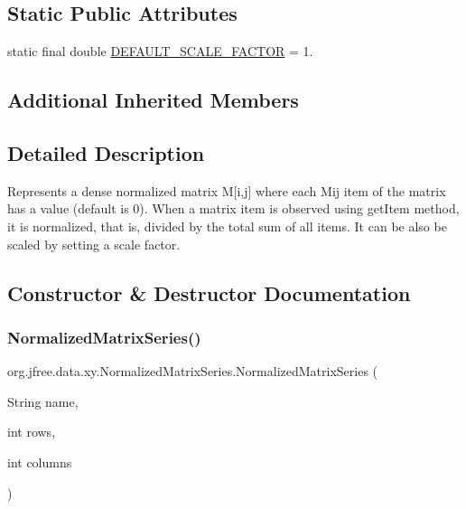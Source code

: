 \subsection*{Static Public Attributes}
\begin{DoxyCompactItemize}
\item 
static final double \mbox{\hyperlink{classorg_1_1jfree_1_1data_1_1xy_1_1_normalized_matrix_series_ad4891de503293749cbd2410a7e3c7bec}{D\+E\+F\+A\+U\+L\+T\+\_\+\+S\+C\+A\+L\+E\+\_\+\+F\+A\+C\+T\+OR}} = 1.
\end{DoxyCompactItemize}
\subsection*{Additional Inherited Members}


\subsection{Detailed Description}
Represents a dense normalized matrix M\mbox{[}i,j\mbox{]} where each Mij item of the matrix has a value (default is 0). When a matrix item is observed using {\ttfamily get\+Item} method, it is normalized, that is, divided by the total sum of all items. It can be also be scaled by setting a scale factor. 

\subsection{Constructor \& Destructor Documentation}
\mbox{\label{classorg_1_1jfree_1_1data_1_1xy_1_1_normalized_matrix_series_a810e10876f0478ec31b689c161039ea7}} 
\subsubsection{\texorpdfstring{Normalized\+Matrix\+Series()}{NormalizedMatrixSeries()}}
{\footnotesize\ttfamily org.\+jfree.\+data.\+xy.\+Normalized\+Matrix\+Series.\+Normalized\+Matrix\+Series (\begin{DoxyParamCaption}\item[{String}]{name,  }\item[{int}]{rows,  }\item[{int}]{columns }\end{DoxyParamCaption})}

